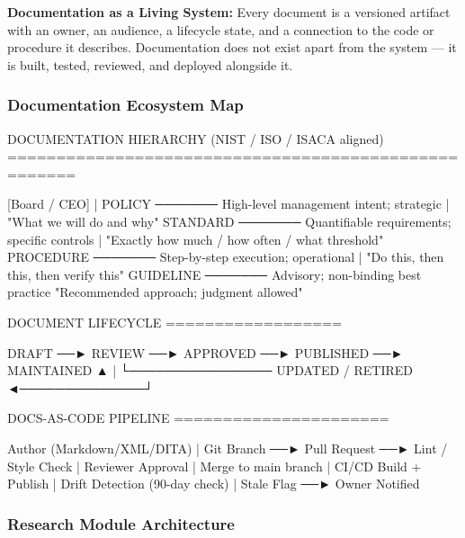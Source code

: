 \documentclass[11pt,letterpaper]{article}
\begin{document}
\textbf{Documentation as a Living System:} Every document is a versioned artifact with an owner, an audience, a lifecycle state, and a connection to the code or procedure it describes. Documentation does not exist apart from the system --- it is built, tested, reviewed, and deployed alongside it.

\subsubsection{Documentation Ecosystem Map}

\begin{asciibox}
DOCUMENTATION HIERARCHY (NIST / ISO / ISACA aligned)
=====================================================

  [Board / CEO]
       |
   POLICY  ─────── High-level management intent; strategic
       |            "What we will do and why"
   STANDARD ─────── Quantifiable requirements; specific controls
       |            "Exactly how much / how often / what threshold"
   PROCEDURE ─────── Step-by-step execution; operational
       |            "Do this, then this, then verify this"
   GUIDELINE ─────── Advisory; non-binding best practice
                    "Recommended approach; judgment allowed"

DOCUMENT LIFECYCLE
==================

  DRAFT ──► REVIEW ──► APPROVED ──► PUBLISHED ──► MAINTAINED
     ▲                                                  |
     └──────────────── UPDATED / RETIRED ◄──────────────┘

DOCS-AS-CODE PIPELINE
======================

  Author (Markdown/XML/DITA)
       |
  Git Branch ──► Pull Request ──► Lint / Style Check
                                        |
                                  Reviewer Approval
                                        |
                               Merge to main branch
                                        |
                           CI/CD Build + Publish
                                        |
                          Drift Detection (90-day check)
                                        |
                            Stale Flag ──► Owner Notified
\end{asciibox}

\subsubsection{Research Module Architecture}
\end{document}
